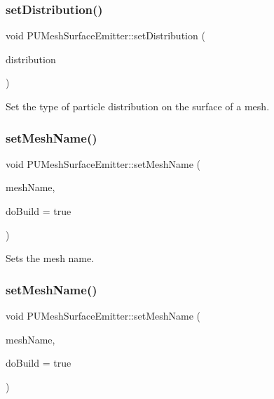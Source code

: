 \subsubsection{\texorpdfstring{set\+Distribution()}{setDistribution()}\hspace{0.1cm}{\footnotesize\ttfamily [2/2]}}
{\footnotesize\ttfamily void P\+U\+Mesh\+Surface\+Emitter\+::set\+Distribution (\begin{DoxyParamCaption}\item[{\hyperlink{classMeshInfo_aadc99105abbc3bd033e33c6ba512a13b}{Mesh\+Info\+::\+Mesh\+Surface\+Distribution}}]{distribution }\end{DoxyParamCaption})}

Set the type of particle distribution on the surface of a mesh. \mbox{\label{classPUMeshSurfaceEmitter_a48ff37dbec592524c2f706d6900cc709}} 
\subsubsection{\texorpdfstring{set\+Mesh\+Name()}{setMeshName()}\hspace{0.1cm}{\footnotesize\ttfamily [1/2]}}
{\footnotesize\ttfamily void P\+U\+Mesh\+Surface\+Emitter\+::set\+Mesh\+Name (\begin{DoxyParamCaption}\item[{const std\+::string \&}]{mesh\+Name,  }\item[{bool}]{do\+Build = {\ttfamily true} }\end{DoxyParamCaption})}

Sets the mesh name. \mbox{\label{classPUMeshSurfaceEmitter_a48ff37dbec592524c2f706d6900cc709}} 
\subsubsection{\texorpdfstring{set\+Mesh\+Name()}{setMeshName()}\hspace{0.1cm}{\footnotesize\ttfamily [2/2]}}
{\footnotesize\ttfamily void P\+U\+Mesh\+Surface\+Emitter\+::set\+Mesh\+Name (\begin{DoxyParamCaption}\item[{const std\+::string \&}]{mesh\+Name,  }\item[{bool}]{do\+Build = {\ttfamily true} }\end{DoxyParamCaption})}


